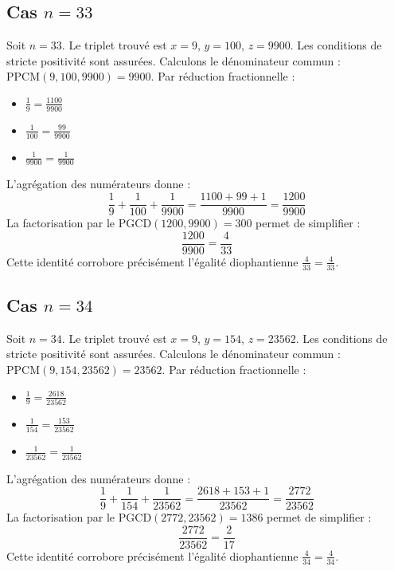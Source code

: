 \documentclass[11pt,a4paper]{article}
\begin{document}
\subsection{Cas $n = 33$}
Soit $n = 33$. Le triplet trouvé est $x = 9$, $y = 100$, $z = 9900$.
Les conditions de stricte positivité sont assurées.
Calculons le dénominateur commun : $\text{PPCM}(9, 100, 9900) = 9900$.
Par réduction fractionnelle :
\begin{itemize}
    \item $\frac{1}{9} = \frac{1100}{9900}$
    \item $\frac{1}{100} = \frac{99}{9900}$
    \item $\frac{1}{9900} = \frac{1}{9900}$
\end{itemize}
L'agrégation des numérateurs donne :
$$ \frac{1}{9} + \frac{1}{100} + \frac{1}{9900} = \frac{1100 + 99 + 1}{9900} = \frac{1200}{9900} $$
La factorisation par le $\text{PGCD}(1200, 9900) = 300$ permet de simplifier :
$$ \frac{1200}{9900} = \frac{4}{33} $$
Cette identité corrobore précisément l'égalité diophantienne $\frac{4}{33} = \frac{4}{33}$.

\subsection{Cas $n = 34$}
Soit $n = 34$. Le triplet trouvé est $x = 9$, $y = 154$, $z = 23562$.
Les conditions de stricte positivité sont assurées.
Calculons le dénominateur commun : $\text{PPCM}(9, 154, 23562) = 23562$.
Par réduction fractionnelle :
\begin{itemize}
    \item $\frac{1}{9} = \frac{2618}{23562}$
    \item $\frac{1}{154} = \frac{153}{23562}$
    \item $\frac{1}{23562} = \frac{1}{23562}$
\end{itemize}
L'agrégation des numérateurs donne :
$$ \frac{1}{9} + \frac{1}{154} + \frac{1}{23562} = \frac{2618 + 153 + 1}{23562} = \frac{2772}{23562} $$
La factorisation par le $\text{PGCD}(2772, 23562) = 1386$ permet de simplifier :
$$ \frac{2772}{23562} = \frac{2}{17} $$
Cette identité corrobore précisément l'égalité diophantienne $\frac{4}{34} = \frac{4}{34}$.
\end{document}
